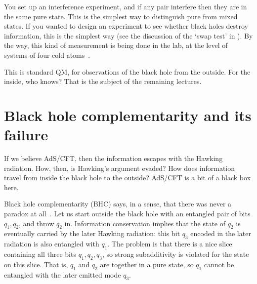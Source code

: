 \documentclass[12pt]{article}
\newcommand{\sect}[1]{\section{#1}\setcounter{equation}{0}}
\begin{document}
You set up an interference experiment, and if any pair interfere then they are in the same pure state.  This is the simplest way to distinguish pure from mixed states.  If you wanted to design an experiment to see whether black holes destroy information, this is the simplest way (see the discussion of the `swap test' in \cite{Hayden:2007cs,Harlow:2014yka}).  By the way, this kind of measurement is being done in the lab, at the level of systems of four cold atoms~\cite{rislam}.


This is standard QM,  for observations of the black hole from the outside.  For the inside, who knows?  
That is the subject of the remaining lectures.



\sect{Black hole complementarity and its failure}

If we believe AdS/CFT, then the information escapes with the Hawking radiation.  How, then, is Hawking's argument evaded?  How does information travel from inside the black hole to the outside?  AdS/CFT is a bit of a black box here.



Black hole complementarity (BHC) says, in a sense, that there was never a paradox at all~\cite{Susskind:1993if,Stephens:1993an,Susskind:1993mu,Preskill}.  Let us start outside the black hole with an entangled pair of bits
$q_1,q_2$, and throw $q_2$ in.  Information conservation implies that the state of $q_2$ is eventually carried by the later Hawking radiation: this bit $q_3$ encoded in the later radiation is also entangled with $q_1$.  The problem is that there is a nice slice containing all three bits $q_1, q_2, q_3$, so strong subadditivity is violated for the state on this slice.  That is, $q_1$ and $q_2$ are together in a pure state, so $q_1$ cannot be entangled with the later emitted mode $q_3$.
\end{document}
